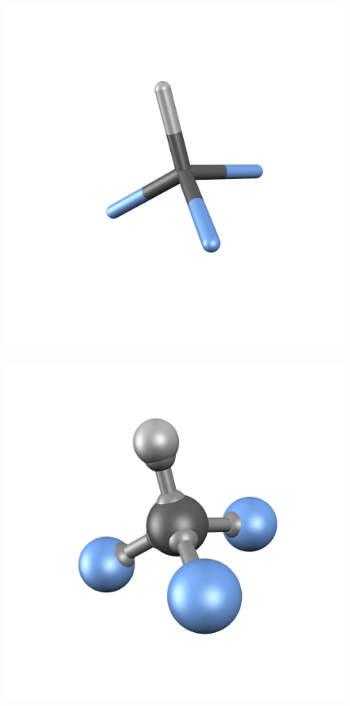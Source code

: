 \documentclass[a4paper,12pt]{article}
\begin{document}
\begin{figure}[h]
\begin{center}
\includegraphics[scale=0.20]{figures/CHF3-tubes.png}\hspace{-15mm}~
\includegraphics[scale=0.20]{figures/CHF3-moly.png}\hspace{-15mm}~

\end{center}
\end{figure}
\end{document}
